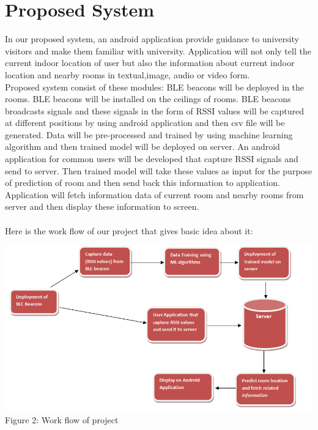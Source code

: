 \documentclass{article}
\begin{document}
\section{Proposed System}
In our proposed system, an android application provide guidance to university visitors and make them familiar with university. Application will not only tell the current indoor location of user but also the information about current indoor location and nearby rooms in textual,image, audio or video form.
\\
Proposed system consist of these modules:
BLE beacons will be deployed in the rooms. BLE beacons will be installed on the ceilings of rooms.
BLE beacons broadcasts signals and these signals in the form of RSSI values will be captured at different positions by using android application and then csv file will be generated.
Data will be pre-processed and trained by using machine learning algorithm and then trained model will be deployed on server.
An android application for common users will be developed that capture RSSI signals and send to server. Then trained model will take these values as input for the purpose of prediction of room and then send back this information to application.
Application will fetch information data of current room and nearby rooms from server and then display these information to screen.
\\
\\
Here is the work flow of our project that gives basic idea about it:
\begin{center}
\includegraphics[scale=0.7]{diagram}
\\Figure 2: Work flow of project 
\end{center}
\end{document}
